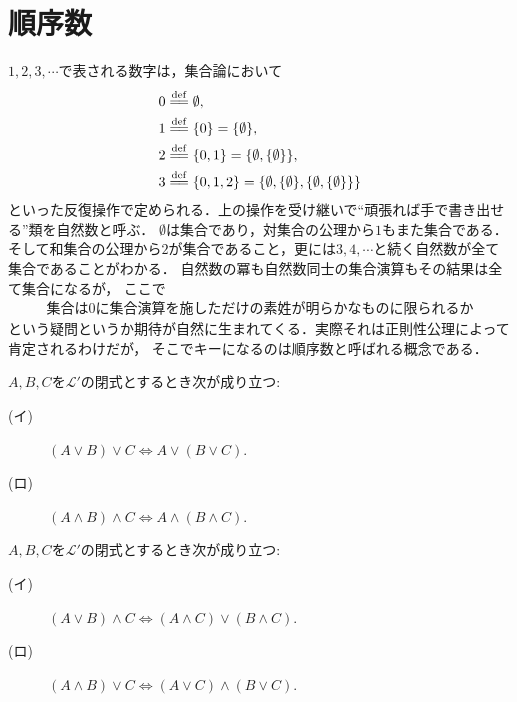 \section{順序数}
	$1,2,3,\cdots$で表される数字は，集合論において
	\begin{align}
		0 &\defeq \emptyset, \\
		1 &\defeq \{0\} = \{\emptyset\}, \\
		2 &\defeq \{0,1\} = \{\emptyset,\{\emptyset\}\}, \\
		3 &\defeq \{0,1,2\} = \{\emptyset,\{\emptyset\},\{\emptyset,\{\emptyset\}\}\}
	\end{align}
	といった反復操作で定められる．上の操作を受け継いで``頑張れば手で書き出せる''類を自然数と呼ぶ．
	$\emptyset$は集合であり，対集合の公理から$1$もまた集合である．
	そして和集合の公理から$2$が集合であること，更には$3,4,\cdots$と続く自然数が全て集合であることがわかる．
	自然数の冪も自然数同士の集合演算もその結果は全て集合になるが，
	ここで
	\begin{align}
		\mbox{集合は$0$に集合演算を施しただけの素姓が明らかなものに限られるか}
	\end{align}
	という疑問というか期待が自然に生まれてくる．実際それは正則性公理によって肯定されるわけだが，
	そこでキーになるのは順序数と呼ばれる概念である．
	
	\begin{screen}
		\begin{logicalthm}\label{logicalthm:associative_law}
			$A,B,C$を$\mathcal{L}'$の閉式とするとき次が成り立つ:
			\begin{description}
				\item[(イ)] $(A \vee B) \vee C \Longleftrightarrow A \vee (B \vee C)$.
				\item[(ロ)] $(A \wedge B) \wedge C \Longleftrightarrow A \wedge (B \wedge C)$.
			\end{description}
		\end{logicalthm}
	\end{screen}
	
	\begin{screen}
		\begin{logicalthm}\label{logicalthm:distributive_law}
			$A,B,C$を$\mathcal{L}'$の閉式とするとき次が成り立つ:
			\begin{description}
				\item[(イ)] $(A \vee B) \wedge C \Longleftrightarrow (A \wedge C) \vee (B \wedge C)$.
				\item[(ロ)] $(A \wedge B) \vee C \Longleftrightarrow (A \vee C) \wedge (B \vee C)$.
			\end{description}
		\end{logicalthm}
	\end{screen}
	

